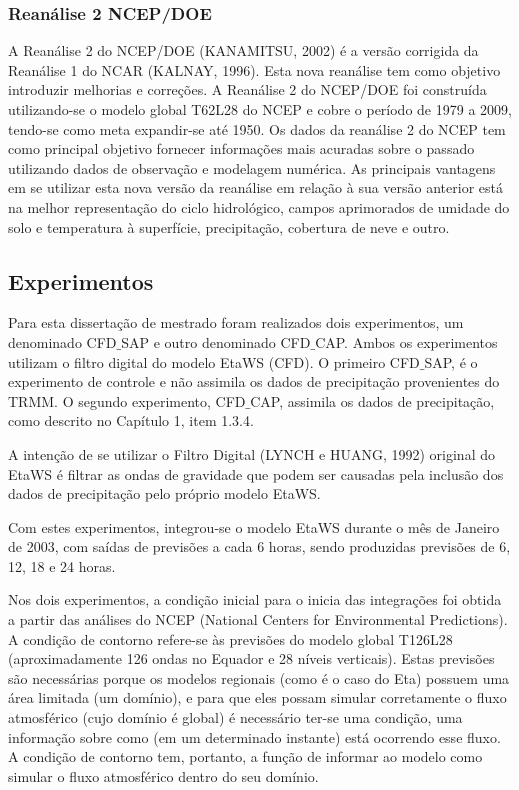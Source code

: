 \subsubsection{Reanálise 2 NCEP/DOE}

A Reanálise 2 do NCEP/DOE (KANAMITSU, 2002) é a versão corrigida da Reanálise 1 do NCAR (KALNAY, 1996). Esta nova reanálise tem como objetivo introduzir melhorias e correções. A Reanálise 2 do NCEP/DOE foi construída utilizando-se o modelo global T62L28 do NCEP e cobre o período de 1979 a 2009, tendo-se como meta expandir-se até 1950. Os dados da reanálise 2 do NCEP tem como principal objetivo fornecer informações mais acuradas sobre o passado utilizando dados de observação e modelagem numérica. As principais vantagens em se utilizar esta nova versão da reanálise em relação à sua versão anterior está na melhor representação do ciclo hidrológico, campos aprimorados de umidade do solo e temperatura à superfície, precipitação, cobertura de neve e outro.

\subsection{Experimentos}

Para esta dissertação de mestrado foram realizados dois experimentos, um denominado CFD$\_$SAP e outro denominado CFD$\_$CAP. Ambos os experimentos utilizam o filtro digital do modelo EtaWS (CFD). O primeiro CFD$\_$SAP, é o experimento de controle e não assimila os dados de precipitação provenientes do TRMM. O segundo experimento, CFD$\_$CAP, assimila os dados de precipitação, como descrito no Capítulo 1, item 1.3.4. 

A intenção de se utilizar o Filtro Digital (LYNCH e HUANG, 1992) original do EtaWS é filtrar as ondas de gravidade que podem ser causadas pela inclusão dos dados de precipitação pelo próprio modelo EtaWS.

Com estes experimentos, integrou-se o modelo EtaWS durante o mês de Janeiro de 2003, com saídas de previsões a cada 6 horas, sendo produzidas previsões de 6, 12, 18 e 24 horas.

Nos dois experimentos, a condição inicial para o inicia das integrações foi obtida a partir das análises do NCEP (National Centers for Environmental Predictions). A condição de contorno refere-se às previsões do modelo global T126L28 (aproximadamente 126 ondas no Equador e 28 níveis verticais). Estas previsões são necessárias porque os modelos regionais (como é o caso do Eta) possuem uma área limitada (um domínio), e para que eles possam simular corretamente o fluxo atmosférico (cujo domínio é global) é necessário ter-se uma condição, uma informação sobre como (em um determinado instante) está ocorrendo esse fluxo. A condição de contorno tem, portanto, a função de informar ao modelo como simular o fluxo atmosférico dentro do seu domínio.

